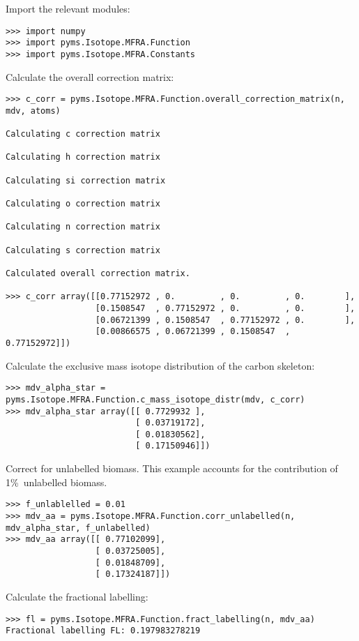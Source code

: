 Import the relevant modules:

\begin{verbatim}
>>> import numpy 
>>> import pyms.Isotope.MFRA.Function 
>>> import pyms.Isotope.MFRA.Constants
\end{verbatim}

Calculate the overall correction matrix:

\begin{verbatim}
>>> c_corr = pyms.Isotope.MFRA.Function.overall_correction_matrix(n, mdv, atoms)

Calculating c correction matrix 

Calculating h correction matrix 

Calculating si correction matrix 

Calculating o correction matrix 

Calculating n correction matrix 

Calculating s correction matrix 

Calculated overall correction matrix.

>>> c_corr array([[0.77152972 , 0.         , 0.         , 0.        ],
                  [0.1508547  , 0.77152972 , 0.         , 0.        ],        
                  [0.06721399 , 0.1508547  , 0.77152972 , 0.        ],
                  [0.00866575 , 0.06721399 , 0.1508547  , 0.77152972]])
\end{verbatim}

Calculate the exclusive mass isotope distribution of the carbon skeleton:

\begin{verbatim}
>>> mdv_alpha_star = pyms.Isotope.MFRA.Function.c_mass_isotope_distr(mdv, c_corr) 
>>> mdv_alpha_star array([[ 0.7729932 ],        
                          [ 0.03719172],        
                          [ 0.01830562],        
                          [ 0.17150946]])
\end{verbatim}

Correct for unlabelled biomass. This example accounts for the contribution
of 1\%\ unlabelled biomass.

\begin{verbatim}
>>> f_unlablelled = 0.01 
>>> mdv_aa = pyms.Isotope.MFRA.Function.corr_unlabelled(n, mdv_alpha_star, f_unlabelled) 
>>> mdv_aa array([[ 0.77102099],        
                  [ 0.03725005],        
                  [ 0.01848709],        
                  [ 0.17324187]])
\end{verbatim}

Calculate the fractional labelling:

\begin{verbatim}
>>> fl = pyms.Isotope.MFRA.Function.fract_labelling(n, mdv_aa) 
Fractional labelling FL: 0.197983278219
\end{verbatim}